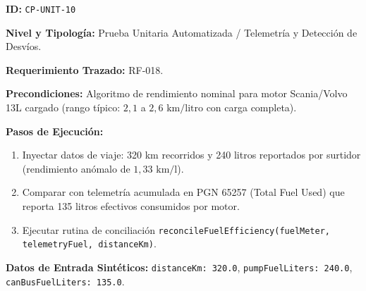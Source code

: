 \par\noindent\textbf{ID:} \texttt{C\allowbreak{}P\allowbreak{}-\allowbreak{}U\allowbreak{}N\allowbreak{}I\allowbreak{}T\allowbreak{}-\allowbreak{}1\allowbreak{}0\allowbreak{}}\par
\par\noindent\textbf{Nivel y Tipología:} Prueba Unitaria Automatizada / Telemetría y Detección de Desvíos.\par
\par\noindent\textbf{Requerimiento Trazado:} RF-018.\par
\par\noindent\textbf{Precondiciones:} Algoritmo de rendimiento nominal para motor Scania/Volvo 13L cargado (rango típico: \(2{,}1\) a \(2{,}6\text{ km/litro}\) con carga completa).\par
\par\noindent\textbf{Pasos de Ejecución:} \par
\begin{enumerate}
\item Inyectar datos de viaje: 320 km recorridos y 240 litros reportados por surtidor (rendimiento anómalo de \(1{,}33\text{ km/l}\)).
\item Comparar con telemetría acumulada en PGN 65257 (Total Fuel Used) que reporta 135 litros efectivos consumidos por motor.
\item Ejecutar rutina de conciliación \texttt{r\allowbreak{}e\allowbreak{}c\allowbreak{}o\allowbreak{}n\allowbreak{}c\allowbreak{}i\allowbreak{}l\allowbreak{}e\allowbreak{}F\allowbreak{}u\allowbreak{}e\allowbreak{}l\allowbreak{}E\allowbreak{}f\allowbreak{}f\allowbreak{}i\allowbreak{}c\allowbreak{}i\allowbreak{}e\allowbreak{}n\allowbreak{}c\allowbreak{}y\allowbreak{}(\allowbreak{}f\allowbreak{}u\allowbreak{}e\allowbreak{}l\allowbreak{}M\allowbreak{}e\allowbreak{}t\allowbreak{}e\allowbreak{}r\allowbreak{},\allowbreak{} t\allowbreak{}e\allowbreak{}l\allowbreak{}e\allowbreak{}m\allowbreak{}e\allowbreak{}t\allowbreak{}r\allowbreak{}y\allowbreak{}F\allowbreak{}u\allowbreak{}e\allowbreak{}l\allowbreak{},\allowbreak{} d\allowbreak{}i\allowbreak{}s\allowbreak{}t\allowbreak{}a\allowbreak{}n\allowbreak{}c\allowbreak{}e\allowbreak{}K\allowbreak{}m\allowbreak{})\allowbreak{}}.
\end{enumerate}
\par\noindent\textbf{Datos de Entrada Sintéticos:} \texttt{d\allowbreak{}i\allowbreak{}s\allowbreak{}t\allowbreak{}a\allowbreak{}n\allowbreak{}c\allowbreak{}e\allowbreak{}K\allowbreak{}m\allowbreak{}:\allowbreak{} 3\allowbreak{}2\allowbreak{}0\allowbreak{}.\allowbreak{}0\allowbreak{}}, \texttt{p\allowbreak{}u\allowbreak{}m\allowbreak{}p\allowbreak{}F\allowbreak{}u\allowbreak{}e\allowbreak{}l\allowbreak{}L\allowbreak{}i\allowbreak{}t\allowbreak{}e\allowbreak{}r\allowbreak{}s\allowbreak{}:\allowbreak{} 2\allowbreak{}4\allowbreak{}0\allowbreak{}.\allowbreak{}0\allowbreak{}}, \texttt{c\allowbreak{}a\allowbreak{}n\allowbreak{}B\allowbreak{}u\allowbreak{}s\allowbreak{}F\allowbreak{}u\allowbreak{}e\allowbreak{}l\allowbreak{}L\allowbreak{}i\allowbreak{}t\allowbreak{}e\allowbreak{}r\allowbreak{}s\allowbreak{}:\allowbreak{} 1\allowbreak{}3\allowbreak{}5\allowbreak{}.\allowbreak{}0\allowbreak{}}.\par
